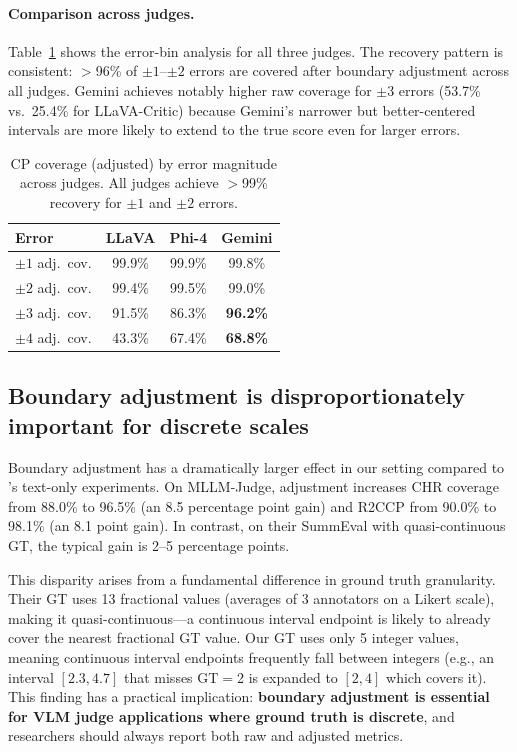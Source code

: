 \documentclass{article}
\begin{document}
\paragraph{Comparison across judges.} Table~\ref{tab:error_bins_all} shows the error-bin analysis for all three judges. The recovery pattern is consistent: $>$96\% of $\pm 1$--$\pm 2$ errors are covered after boundary adjustment across all judges. Gemini achieves notably higher raw coverage for $\pm 3$ errors (53.7\% vs.\ 25.4\% for LLaVA-Critic) because Gemini's narrower but better-centered intervals are more likely to extend to the true score even for larger errors.

\begin{table}[t]
\centering
\caption{CP coverage (adjusted) by error magnitude across judges. All judges achieve $>$99\% recovery for $\pm 1$ and $\pm 2$ errors.}
\label{tab:error_bins_all}
\small
\begin{tabular}{lccc}
\toprule
\textbf{Error} & \textbf{LLaVA} & \textbf{Phi-4} & \textbf{Gemini} \\
\midrule
$\pm 1$ adj.\ cov. & 99.9\% & 99.9\% & 99.8\% \\
$\pm 2$ adj.\ cov. & 99.4\% & 99.5\% & 99.0\% \\
$\pm 3$ adj.\ cov. & 91.5\% & 86.3\% & \textbf{96.2\%} \\
$\pm 4$ adj.\ cov. & 43.3\% & 67.4\% & \textbf{68.8\%} \\
\bottomrule
\end{tabular}
\end{table}

\subsection{Boundary adjustment is disproportionately important for discrete scales}
\label{sec:boundary_analysis}

Boundary adjustment has a dramatically larger effect in our setting compared to \citet{sheng2025analyzing}'s text-only experiments. On MLLM-Judge, adjustment increases CHR coverage from 88.0\% to 96.5\% (an 8.5 percentage point gain) and R2CCP from 90.0\% to 98.1\% (an 8.1 point gain). In contrast, on their SummEval with quasi-continuous GT, the typical gain is 2--5 percentage points.

This disparity arises from a fundamental difference in ground truth granularity. Their GT uses 13 fractional values (averages of 3 annotators on a Likert scale), making it quasi-continuous---a continuous interval endpoint is likely to already cover the nearest fractional GT value. Our GT uses only 5 integer values, meaning continuous interval endpoints frequently fall between integers (e.g., an interval $[2.3, 4.7]$ that misses GT$=$2 is expanded to $[2, 4]$ which covers it). This finding has a practical implication: \textbf{boundary adjustment is essential for VLM judge applications where ground truth is discrete}, and researchers should always report both raw and adjusted metrics.
\end{document}
